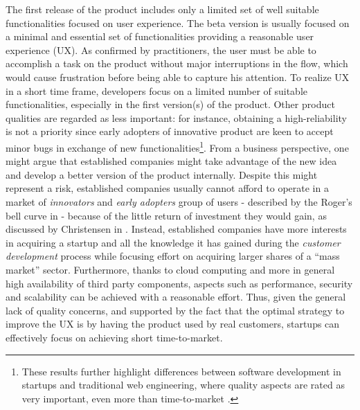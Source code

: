 \documentclass[10pt,journal,letterpaper,compsoc]{IEEEtran}
\begin{document}
\begin{compactitem}
\item The first release of the product includes only a limited set of well suitable functionalities focused on user experience. The beta version is usually focused on a minimal and essential set of functionalities providing a reasonable user experience (UX). As confirmed by practitioners, the user must be able to accomplish a task on the product without major interruptions in the flow, which would cause frustration before being able to capture his attention. To realize UX in a short time frame, developers focus on a limited number of suitable functionalities, especially in the first version(s) of the product. Other product qualities are regarded as less important: for instance, obtaining a high-reliability is not a priority since early adopters of innovative product are keen to accept minor bugs in exchange of new functionalities\footnote{These results further highlight differences between software development in startups and traditional web engineering, where quality aspects are rated as very important, 
even more than time-to-market \cite{Offutt2002}.}. From a business perspective, one might argue that established companies might take advantage of the new idea and develop a better version of the product internally. Despite this might represent a risk, established companies usually cannot afford to operate in a market of \textit{innovators} and \textit{early adopters} group of users - described by the Roger's bell curve in \cite{Rogers} - because of the little return of investment they would gain, as discussed by Christensen in \cite{Christensen2003}. Instead, established companies have more interests in acquiring a startup and all the knowledge it has gained during the \textit{customer development} process while focusing effort on acquiring larger shares of a ``mass market'' sector. Furthermore, thanks to cloud computing and more in general high availability of third party components, aspects such as performance, security and scalability can be achieved with a reasonable effort. Thus, given the general lack 
of quality concerns, and supported by the fact that the optimal strategy to improve the UX is by having the product used by real customers, startups can effectively focus on achieving short time-to-market.


\end{compactitem}
\end{document}
